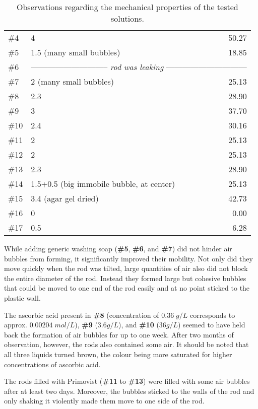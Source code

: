 \begin{table}[]
\begin{tabular}{l|lr}
\#4   & 4					& 50.27				\\
\#5   & 1.5 (many small bubbles)		& 18.85				\\
\#6   & \multicolumn{2}{c}{-----------------------------\textit{ rod was leaking }------------------------------}\\
\#7   & 2 (many small bubbles)			& 25.13				\\
\#8   & 2.3					& 28.90				\\
\#9   & 3					& 37.70				\\
\#10  & 2.4					& 30.16				\\
\#11  & 2					& 25.13				\\
\#12  & 2					& 25.13				\\
\#13  & 2.3					& 28.90				\\
\#14  & 1.5+0.5 (big immobile bubble, at center)	& 25.13				\\
\#15  & 3.4 (agar gel dried)			& 42.73				\\
\#16  & 0					& 0.00				\\
\#17  & 0.5					& 6.28				\\
\bottomrule
\end{tabular}
\caption{Observations regarding the mechanical properties of the tested solutions.}
\label{tab:bubbles}
\end{table}


While adding generic washing soap (\textbf{\#5}, \textbf{\#6}, and \textbf{\#7}) did not hinder air bubbles from forming, it significantly improved their mobility.
Not only did they move quickly when the rod was tilted, large quantities of air also did not block the entire diameter of the rod.
Instead they formed large but cohesive bubbles that could be moved to one end of the rod easily and at no point sticked to the plastic wall.

The ascorbic acid present in \textbf{\#8} (concentration of $0.36 \; g/L$ corresponds to approx. $0.00204 \; mol/L$), \textbf{\#9} ($3.6 g/L$), and \textbf{\#10} ($36 g/L$) seemed to have held back the formation of air bubbles for up to one week.
After two months of observation, however, the rods also contained some air.
It should be noted that all three liquids turned brown, the colour being more saturated for higher concentrations of ascorbic acid.

The rods filled with Primovist (\textbf{\#11} to \textbf{\#13}) were filled with some air bubbles after at least two days.
Moreover, the bubbles sticked to the walls of the rod and only shaking it violently made them move to one side of the rod.

